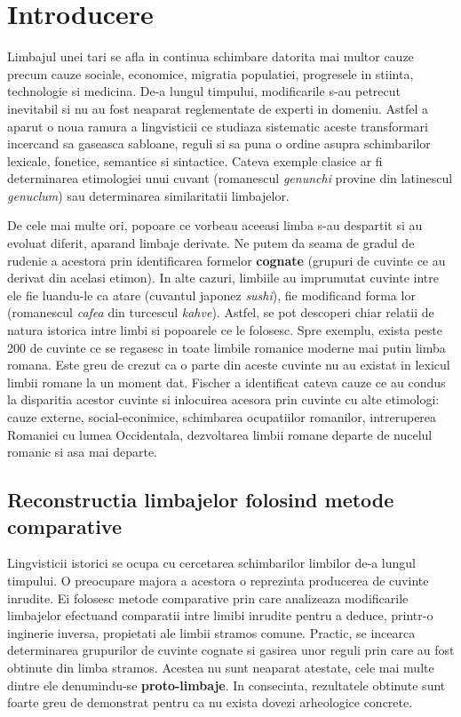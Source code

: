 \chapter{Introducere}
Limbajul unei tari se afla in continua schimbare datorita mai multor cauze precum cauze sociale, 
economice, migratia populatiei, progresele in stiinta, technologie si medicina. De-a lungul timpului,
modificarile s-au petrecut inevitabil si nu au fost neaparat reglementate de experti in domeniu.
Astfel a aparut o noua ramura a lingvisticii ce studiaza sistematic aceste transformari incercand
sa gaseasca sabloane, reguli si sa puna o ordine asupra schimbarilor lexicale, fonetice, semantice
si sintactice. Cateva exemple clasice ar fi determinarea etimologiei unui cuvant (romanescul
\textit{genunchi} provine din latinescul \textit{genuclum}) sau determinarea similaritatii
limbajelor.

De cele mai multe ori, popoare ce vorbeau aceeasi limba s-au despartit si au evoluat diferit, aparand
limbaje derivate. Ne putem da seama de gradul de rudenie a acestora prin identificarea
formelor \textbf{cognate} (grupuri de cuvinte ce au derivat din acelasi etimon). In alte cazuri,
limbiile au imprumutat cuvinte intre ele fie luandu-le ca atare (cuvantul japonez \textit{sushi}),
fie modificand forma lor (romanescul \textit{cafea} din turcescul \textit{kahve}). Astfel, se pot 
descoperi chiar relatii de natura istorica intre limbi si popoarele ce le folosesc. Spre exemplu,
exista peste 200 de cuvinte ce se regasesc in toate limbile romanice moderne mai putin limba
romana. Este greu de crezut ca o parte din aceste cuvinte nu au existat in lexicul limbii romane
la un moment dat. Fischer\cite{fischer} a identificat cateva cauze ce au condus la disparitia acestor cuvinte
si inlocuirea acesora prin cuvinte cu alte etimologi: cauze externe, social-econimice, schimbarea
ocupatiilor romanilor, intreruperea Romaniei cu lumea Occidentala, dezvoltarea limbii romane departe
de nucelul romanic si asa mai departe.

\section{Reconstructia limbajelor folosind metode comparative}
Lingvisticii istorici se ocupa cu cercetarea schimbarilor limbilor de-a lungul timpului. 
O preocupare majora a acestora o reprezinta producerea de cuvinte inrudite. Ei folosesc
metode comparative prin care analizeaza modificarile limbajelor efectuand comparatii intre limibi
inrudite pentru a deduce, printr-o inginerie inversa, propietati ale limbii stramos comune.\cite{weissbook}
Practic, se incearca determinarea grupurilor de cuvinte cognate si gasirea unor reguli prin care
au fost obtinute din limba stramos. Acestea nu sunt neaparat atestate, cele mai multe dintre ele 
denumindu-se \textbf{proto-limbaje}. In consecinta, rezultatele obtinute sunt foarte greu de demonstrat
pentru ca nu exista dovezi arheologice concrete.

